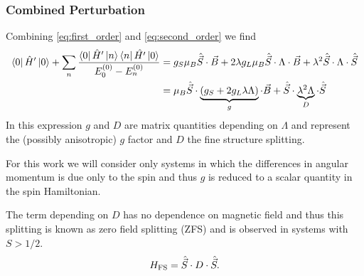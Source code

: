 \subsubsection{Combined Perturbation}
Combining \eqref{eq:first_order} and \eqref{eq:second_order} we find 
\begin{equation}
    \begin{align}
    \bra{0} \hat{H}' \ket{0}+  \sum_{n}\frac{\bra{0} \hat{H}' \ket{n} \bra{n} \hat{H'}\ket{0}}{E_0^{(0)} - E_n^{(0)}}
    &= g_S \mu_B \hat{\vec{S}} \cdot \vec{B} + 2\lambda g_L\mu_B\hat{\vec{S}}\cdot\Lambda\cdot\vec{B} + \lambda^2 \hat{\vec{S}}\cdot \Lambda \cdot \hat{\vec{S}} \\ 
    &=\mu_B \hat{\vec{S}} \cdot \underbrace{(g_S + 2g_L \lambda \Lambda)}_{g} \cdot \vec{B} + \hat{\vec{S}}\cdot \underbrace{\lambda^2 \Lambda}_{D} \cdot \hat{\vec{S}}
    \end{align}
    \label{eq:}
\end{equation}
In this expression $g$ and $D$ are matrix quantities depending on $\Lambda$ and represent the (possibly anisotropic) $g$ factor and $D$ the fine structure splitting. 

For this work we will consider only systems in which the differences in angular momentum is due only to the spin and thus $g$ is reduced to a scalar quantity in the spin Hamiltonian. 

The term depending on $D$ has no dependence on magnetic field and thus this  splitting is known as zero field splitting (ZFS) and is observed in systems with $S > 1/2$. 
\begin{equation}
    H_{\ce{FS}} = \hat{\vec{S}}\cdot D \cdot \hat{\vec{S}}. 
    \label{eq:fine_structure}
\end{equation}







